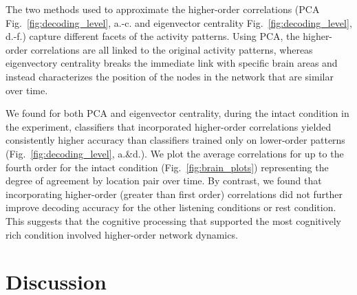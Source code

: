 \documentclass[english]{article}
\begin{document}
The two methods used to approximate the higher-order correlations (PCA Fig.~\ref{fig:decoding_level},  a.-c. and eigenvector
centrality Fig.~\ref{fig:decoding_level},  d.-f.) capture different
facets of the activity patterns.  Using PCA, the higher-order
correlations are all linked to the original activity patterns, whereas
eigenvectory centrality breaks the immediate link with specific brain
areas and instead characterizes the position of the nodes in the
network that are similar over time.

We found for both PCA and eigenvector centrality, during the intact condition in the
experiment, classifiers that incorporated higher-order correlations
yielded consistently higher accuracy than classifiers trained only on
lower-order patterns (Fig.~\ref{fig:decoding_level},  a.\&d.).  We plot
the average correlations for up to the fourth order for the intact
condition (Fig.~\ref{fig:brain_plots}) representing the degree of
agreement by location pair over time.  By
contrast, we found that incorporating higher-order (greater than first
order) correlations did
not further improve decoding accuracy for the other listening
conditions or rest condition.  This suggests
that the cognitive processing that supported the most cognitively rich
condition
involved higher-order network dynamics. 




\section*{Discussion}
\end{document}
